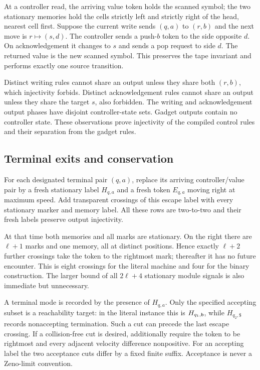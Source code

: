 \documentclass[11pt,letterpaper]{article}
\numberwithin{equation}{section}
\theoremstyle{definition}
\theoremstyle{remark}
\newcommand{\lab}[1]{\mathsf{#1}}\newcommand{\diag}{\operatorname{diag}}
\begin{document}
At a controller read, the arriving value token holds the scanned symbol; the two stationary memories hold the cells strictly left and strictly right of the head, nearest cell first. Suppose the current write sends $(q,a)$ to $(r,b)$ and the next move is $r\mapsto(s,d)$. The controller sends a push-$b$ token to the side opposite $d$. On acknowledgement it changes to $s$ and sends a pop request to side $d$. The returned value is the new scanned symbol. This preserves the tape invariant and performs exactly one source transition.

Distinct writing rules cannot share an output unless they share both $(r,b)$, which injectivity forbids. Distinct acknowledgement rules cannot share an output unless they share the target $s$, also forbidden. The writing and acknowledgement output phases have disjoint controller-state sets. Gadget outputs contain no controller state. These observations prove injectivity of the compiled control rules and their separation from the gadget rules.

\subsection{Terminal exits and conservation}
For each designated terminal pair $(q,a)$, replace its arriving controller/value pair by a fresh stationary label $H_{q,a}$ and a fresh token $E_{q,a}$ moving right at maximum speed. Add transparent crossings of this escape label with every stationary marker and memory label. All these rows are two-to-two and their fresh labels preserve output injectivity.

At that time both memories and all marks are stationary. On the right there are $\ell+1$ marks and one memory, all at distinct positions. Hence exactly $\ell+2$ further crossings take the token to the rightmost mark; thereafter it has no future encounter. This is eight crossings for the literal machine and four for the binary construction. The larger bound of all $2\ell+4$ stationary module signals is also immediate but unnecessary.

A terminal mode is recorded by the presence of $H_{q,a}$. Only the specified accepting subset is a reachability target: in the literal instance this is $H_{q_1,\mathsf b}$, while $H_{q_2,\lab\$}$ records nonaccepting termination. Such a cut can precede the last escape crossing. If a collision-free cut is desired, additionally require the token to be rightmost and every adjacent velocity difference nonpositive. For an accepting label the two acceptance cuts differ by a fixed finite suffix. Acceptance is never a Zeno-limit convention.
\end{document}
